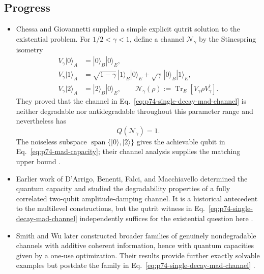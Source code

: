 \subsection*{Progress}

\begin{itemize}
  \item Chessa and Giovannetti supplied a simple explicit qutrit solution to
  the existential problem.  For $1/2<\gamma<1$, define a channel
  $\mathcal N_\gamma$ by the Stinespring isometry
  \begin{equation}
    \begin{aligned}
      V_\gamma|0\rangle_A&=|0\rangle_B|0\rangle_E,\\
      V_\gamma|1\rangle_A
        &=\sqrt{1-\gamma}\,|1\rangle_B|0\rangle_E
          +\sqrt{\gamma}\,|0\rangle_B|1\rangle_E,\\
      V_\gamma|2\rangle_A&=|2\rangle_B|0\rangle_E,
      \qquad
      \mathcal N_\gamma(\rho):=
        \operatorname{Tr}_E[V_\gamma\rho V_\gamma^\dagger].
    \end{aligned}
    \label{eq:p74-single-decay-mad-channel}
  \end{equation}
  They proved that the channel in
  Eq.~\eqref{eq:p74-single-decay-mad-channel} is neither degradable nor
  antidegradable throughout this parameter range and nevertheless has
  \begin{equation}
    Q(\mathcal N_\gamma)=1.
    \label{eq:p74-mad-capacity}
  \end{equation}
  The noiseless subspace $\operatorname{span}\{|0\rangle,|2\rangle\}$ gives
  the achievable qubit in Eq.~\eqref{eq:p74-mad-capacity}; their channel
  analysis supplies the matching upper bound
  .

  \item Earlier work of D'Arrigo, Benenti, Falci, and Macchiavello determined
  the quantum capacity and studied the degradability properties of a fully
  correlated two-qubit amplitude-damping channel.  It is a historical
  antecedent to the multilevel constructions, but the qutrit witness in
  Eq.~\eqref{eq:p74-single-decay-mad-channel} independently suffices for the
  existential question here
  .

  \item Smith and Wu later constructed broader families of genuinely
  nondegradable channels with additive coherent information, hence with
  quantum capacities given by a one-use optimization.  Their results provide
  further exactly solvable examples but postdate the family in
  Eq.~\eqref{eq:p74-single-decay-mad-channel}
  .
\end{itemize}


